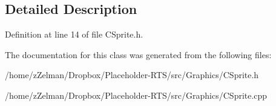 \subsection{Detailed Description}


Definition at line 14 of file C\-Sprite.\-h.



The documentation for this class was generated from the following files\-:\begin{DoxyCompactItemize}
\item 
/home/z\-Zelman/\-Dropbox/\-Placeholder-\/\-R\-T\-S/src/\-Graphics/C\-Sprite.\-h\item 
/home/z\-Zelman/\-Dropbox/\-Placeholder-\/\-R\-T\-S/src/\-Graphics/C\-Sprite.\-cpp\end{DoxyCompactItemize}
